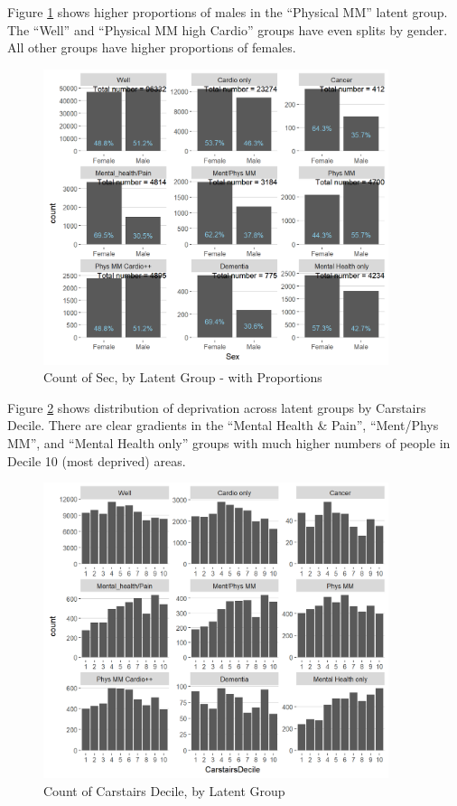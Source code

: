 \documentclass[12pt,]{report}
\begin{document}
Figure \ref{fig:lg-by-sex} shows higher proportions of males in the
``Physical MM'' latent group. The ``Well'' and ``Physical MM high
Cardio'' groups have even splits by gender. All other groups have higher
proportions of females.

\begin{figure}
  \centering
    \includegraphics[width=0.9\textwidth]{figures/lg-by-sex.png}
  \caption{Count of Sec, by Latent Group - with Proportions}
  \label{fig:lg-by-sex}
\end{figure}

Figure \ref{fig:lg-by-dep} shows distribution of deprivation across
latent groups by Carstairs Decile. There are clear gradients in the
``Mental Health \& Pain'', ``Ment/Phys MM'', and ``Mental Health only''
groups with much higher numbers of people in Decile 10 (most deprived)
areas.

\begin{figure}
  \centering
    \includegraphics[width=0.9\textwidth]{figures/lg-by-dep.png}
  \caption{Count of Carstairs Decile, by Latent Group}
  \label{fig:lg-by-dep}
\end{figure}
\end{document}
